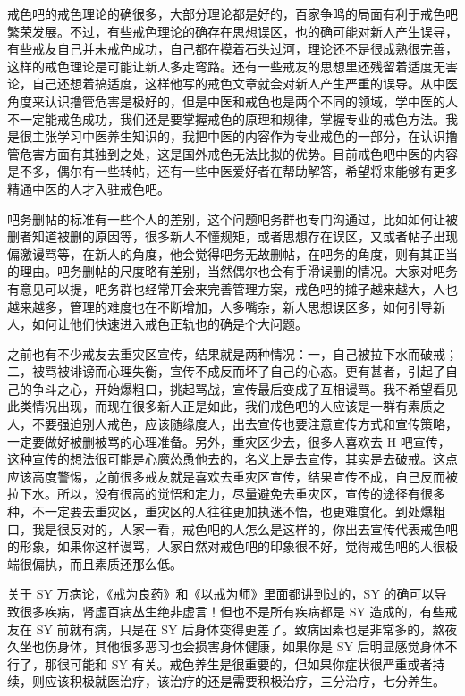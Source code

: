 \documentclass{ctexart}
\begin{document}
戒色吧的戒色理论的确很多，大部分理论都是好的，百家争鸣的局面有利于戒色吧繁荣发展。不过，有些戒色理论的确存在思想误区，也的确可能对新人产生误导，有些戒友自己并未戒色成功，自己都在摸着石头过河，理论还不是很成熟很完善，这样的戒色理论是可能让新人多走弯路。还有一些戒友的思想里还残留着适度无害论，自己还想着搞适度，这样他写的戒色文章就会对新人产生严重的误导。从中医角度来认识撸管危害是极好的，但是中医和戒色也是两个不同的领域，学中医的人不一定能戒色成功，我们还是要掌握戒色的原理和规律，掌握专业的戒色方法。我是很主张学习中医养生知识的，我把中医的内容作为专业戒色的一部分，在认识撸管危害方面有其独到之处，这是国外戒色无法比拟的优势。目前戒色吧中医的内容是不多，偶尔有一些转帖，还有一些中医爱好者在帮助解答，希望将来能够有更多精通中医的人才入驻戒色吧。

吧务删帖的标准有一些个人的差别，这个问题吧务群也专门沟通过，比如如何让被删者知道被删的原因等，很多新人不懂规矩，或者思想存在误区，又或者帖子出现偏激谩骂等，在新人的角度，他会觉得吧务无故删帖，在吧务的角度，则有其正当的理由。吧务删帖的尺度略有差别，当然偶尔也会有手滑误删的情况。大家对吧务有意见可以提，吧务群也经常开会来完善管理方案，戒色吧的摊子越来越大，人也越来越多，管理的难度也在不断增加，人多嘴杂，新人思想误区多，如何引导新人，如何让他们快速进入戒色正轨也的确是个大问题。

之前也有不少戒友去重灾区宣传，结果就是两种情况：一，自己被拉下水而破戒；二，被骂被诽谤而心理失衡，宣传不成反而坏了自己的心态。更有甚者，引起了自己的争斗之心，开始爆粗口，挑起骂战，宣传最后变成了互相谩骂。我不希望看见此类情况出现，而现在很多新人正是如此，我们戒色吧的人应该是一群有素质之人，不要强迫别人戒色，应该随缘度人，出去宣传也要注意宣传方式和宣传策略，一定要做好被删被骂的心理准备。另外，重灾区少去，很多人喜欢去 H 吧宣传，这种宣传的想法很可能是心魔怂恿他去的，名义上是去宣传，其实是去破戒。这点应该高度警惕，之前很多戒友就是喜欢去重灾区宣传，结果宣传不成，自己反而被拉下水。所以，没有很高的觉悟和定力，尽量避免去重灾区，宣传的途径有很多种，不一定要去重灾区，重灾区的人往往更加执迷不悟，也更难度化。到处爆粗口，我是很反对的，人家一看，戒色吧的人怎么是这样的，你出去宣传代表戒色吧的形象，如果你这样谩骂，人家自然对戒色吧的印象很不好，觉得戒色吧的人很极端很偏执，而且素质还那么低。

关于 SY 万病论，《戒为良药》和《以戒为师》里面都讲到过的，SY 的确可以导致很多疾病，肾虚百病丛生绝非虚言！但也不是所有疾病都是 SY 造成的，有些戒友在 SY 前就有病，只是在 SY 后身体变得更差了。致病因素也是非常多的，熬夜久坐也伤身体，其他很多恶习也会损害身体健康，如果你是 SY 后明显感觉身体不行了，那很可能和 SY 有关。戒色养生是很重要的，但如果你症状很严重或者持续，则应该积极就医治疗，该治疗的还是需要积极治疗，三分治疗，七分养生。
\end{document}
